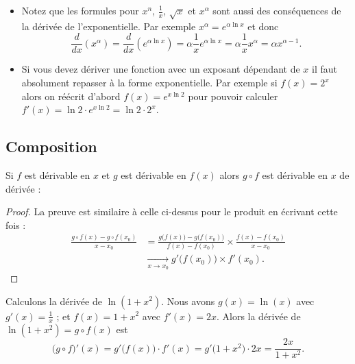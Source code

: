 \documentclass[class=report,crop=false]{standalone}
\begin{document}
\begin{remarque*}
\sauteligne
\begin{itemize}
  \item Notez que les formules pour $x^n$, $\frac 1x$, $\sqrt x$ et $x^\alpha$
sont aussi des conséquences de la dérivée de l'exponentielle.
Par exemple $x^\alpha = e^{\alpha \ln x}$ et donc
$$\frac{d }{dx}(x^\alpha) = \frac{d}{dx} (e^{\alpha \ln x}) = \alpha \frac{1}{x} e^{\alpha \ln x} =\alpha \frac 1x x^{\alpha}=\alpha x^{\alpha-1}.$$

  \item Si vous devez dériver une fonction avec un exposant dépendant de $x$ il faut absolument
repasser à la forme exponentielle.
Par exemple si $f(x)= 2^x$ alors on réécrit d'abord $f(x)=e^{x\ln 2}$ pour pouvoir calculer
$f'(x)=\ln 2 \cdot  e^{x\ln 2} = \ln 2  \cdot 2^x$.
\end{itemize}

\end{remarque*}




\subsection{Composition}

\begin{proposition}
Si $f$ est dérivable en $x$ et $g$ est dérivable en $f(x)$ alors $g\circ f$ est
dérivable en $x$ de dérivée :
\end{proposition}

\begin{proof}
La preuve est similaire à celle ci-dessus pour le produit en écrivant cette fois :
\begin{align*}
\frac{g\circ f(x)-g\circ f(x_0)}{x-x_0} 
&= \frac{g\big( f(x)\big)-g\big( f(x_0)\big)}{f(x)-f(x_0)} \times \frac{f(x)-f(x_0)}{x-x_0} \\
&\xrightarrow[x\to x_0]{} g'\big(f(x_0)\big) \times f'(x_0).
\end{align*}
\end{proof}


\begin{exemple}
Calculons la dérivée de $\ln(1+x^2)$. Nous avons $g(x)=\ln(x)$ avec $g'(x) = \frac 1x$ ; et
 $f(x)=1+x^2$ avec $f'(x) = 2x$.
Alors la dérivée de $\ln(1+x^2)=g\circ f(x)$ est
$$\big( g \circ f \big)'(x) = g'\big( f(x) \big) \cdot f'(x) = g'\big( 1+x^2 \big) \cdot 2x = \frac{2x}{1+x^2}.$$
\end{exemple}
\end{document}
